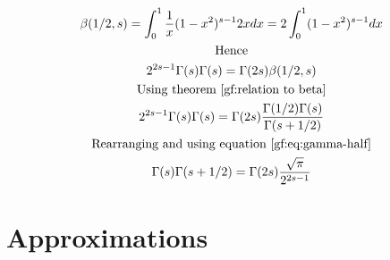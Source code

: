 \documentclass[a4paper]{article}
\begin{document}
\begin{theorem}
\begin{gather*}
            \beta(1/2, s)
            =
            \int_{0}^{1} \frac{1}{x}(1-x^2)^{s-1} 2x dx
            =
            2\int_{0}^{1} (1-x^2)^{s-1} dx
            \\
            \text{Hence}
            \\
            2^{2s -1} \Gamma(s) \Gamma(s)= \Gamma(2s) \beta(1/2, s)
            \\
            \text{Using theorem~\ref{gf:relation to beta}}
            \\
            2^{2s -1} \Gamma(s) \Gamma(s)= \Gamma(2s) \frac{\Gamma(1/2) \Gamma(s)}{\Gamma(s+1/2)}
            \\
            \text{Rearranging and using equation~\ref{gf:eq:gamma-half}}
            \\
            \Gamma(s) \Gamma(s+1/2)= \Gamma(2s) \frac{\sqrt{\pi}}{2^{2s -1}}
        \end{gather*}
    \end{theorem}

    \pagebreak


    \section{Approximations}\label{gf:sec:approximations}
\end{document}
